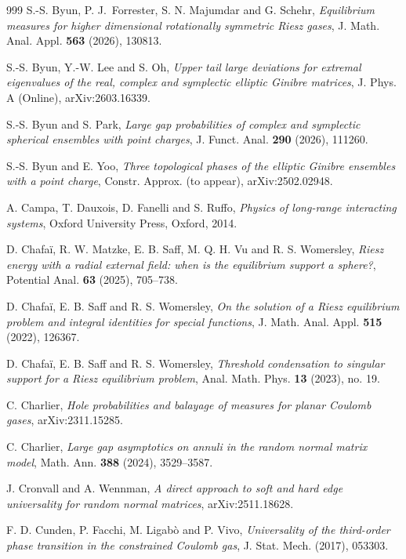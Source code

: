\documentclass{amsart}
\theoremstyle{plain}
\theoremstyle{remark}
\numberwithin{equation}{section}
\begin{document}
\begin{thebibliography}{999}
 S.-S. Byun, P. J.~Forrester, S. N. Majumdar and G. Schehr, \emph{Equilibrium measures for higher dimensional rotationally symmetric Riesz gases}, J. Math. Anal. Appl. \textbf{563} (2026), 130813. 


 S.-S. Byun, Y.-W. Lee and S. Oh, \emph{Upper tail large deviations for extremal eigenvalues of the real, complex and symplectic elliptic Ginibre matrices}, J. Phys. A (Online), arXiv:2603.16339. 

 S.-S. Byun and S. Park, \emph{Large gap probabilities of complex and symplectic spherical ensembles with point charges}, J. Funct. Anal. \textbf{290} (2026), 111260.

 S.-S. Byun and E. Yoo, \emph{Three topological phases of the elliptic Ginibre ensembles with a point charge}, Constr. Approx. (to appear), arXiv:2502.02948.

 A. Campa, T. Dauxois, D. Fanelli and S. Ruffo, \emph{Physics of long-range interacting systems}, Oxford University Press, Oxford, 2014.

 D. Chafaï, R. W. Matzke, E. B. Saff, M. Q. H. Vu and R. S. Womersley, \emph{Riesz energy with a radial
external field: when is the equilibrium support a sphere?}, Potential Anal. \textbf{63} (2025), 705--738.

 D. Chafaï, E. B. Saff and R. S. Womersley, \emph{On the solution of a Riesz equilibrium problem and integral identities for special functions}, J. Math. Anal. Appl. \textbf{515} (2022), 126367.

 D. Chafaï, E. B. Saff and R. S. Womersley, \emph{Threshold condensation to singular support for a Riesz equilibrium problem}, Anal. Math. Phys. \textbf{13} (2023), no. 19.

 C. Charlier, \emph{Hole probabilities and balayage of measures for planar Coulomb gases}, arXiv:2311.15285. 

 C. Charlier, \emph{Large gap asymptotics on annuli in the random normal matrix model}, Math. Ann. \textbf{388} (2024), 3529--3587.


 J. Cronvall and A. Wennman, \emph{A direct approach to soft and hard edge universality for random normal matrices}, arXiv:2511.18628.

 F. D. Cunden, P. Facchi, M. Ligab{\`o} and P. Vivo, \emph{Universality of the third-order phase transition in the constrained Coulomb gas}, J. Stat. Mech. (2017), 053303.


\end{thebibliography}
\end{document}
